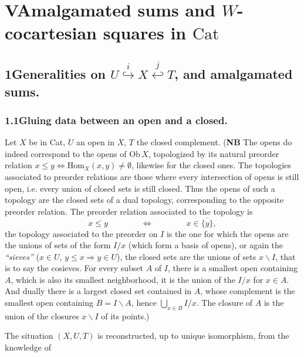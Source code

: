 

\section*{V\quad Amalgamated sums and $W$-cocartesian squares in $\mathrm{Cat}$}

\subsection*{1\quad Generalities on $U \overset{i}{\hookrightarrow} X \overset{j}{\hookleftarrow} T$, and amalgamated sums.}

\subsubsection*{1.1\quad Gluing data between an open and a closed.}

Let $X$ be in Cat, $U$ an open in $X$, $T$ the closed complement. (\textbf{NB} The opens do indeed correspond to the opens of $\mathrm{Ob}\,X$, topologized by its natural preorder relation $x \leq y \iff \mathrm{Hom}_X(x,y) \neq \emptyset$, likewise for the closed ones. The topologies associated to preorder relations are those where every intersection of opens is still open, i.e. every union of closed sets is still closed. Thus the opens of such a topology are the closed sets of a dual topology, corresponding to the opposite preorder relation. The preorder relation associated to the topology is
\[
x \leq y \qquad\qquad \iff \qquad\qquad x \in \overline{\{y\}},
\]
the topology associated to the preorder on $I$ is the one for which the opens are the unions of sets of the form $I/x$ (which form a basis of opens), or again the \textit{``sieves''} ($x \in U$, $y \leq x \Longrightarrow y \in U$), the closed sets are the unions of sets $x\backslash I$, that is to say the cosieves. For every subset $A$ of $I$, there is a smallest open containing $A$, which is also its smallest neighborhood, it is the union of the $I/x$ for $x \in A$. And dually there is a largest closed set contained in $A$, whose complement is the smallest open containing $B = I\backslash A$, hence $\bigcup_{x\in B} I/x$. The closure of $A$ is the union of the closures $x\backslash I$ of its points.)


The situation $(X,U,T)$ is reconstructed, up to unique isomorphism, from the knowledge of

